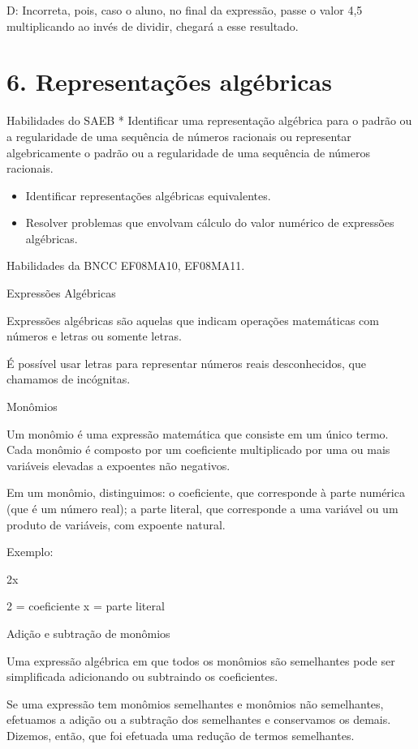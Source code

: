 {D: Incorreta, pois, caso o aluno, no final da expressão, passe o valor
4,5 multiplicando ao invés de dividir, chegará a esse resultado.


\section{6. Representações
algébricas}

Habilidades do SAEB * Identificar uma representação algébrica para o
padrão ou a regularidade de uma sequência de números racionais ou
representar algebricamente o padrão ou a regularidade de uma sequência
de números racionais.

\begin{itemize}
\item
  Identificar representações algébricas equivalentes.
\item
  Resolver problemas que envolvam cálculo do valor numérico de
  expressões algébricas.
\end{itemize}

Habilidades da BNCC EF08MA10, EF08MA11.

Expressões Algébricas

Expressões algébricas são aquelas que indicam operações matemáticas com
números e letras ou somente letras.

É possível usar letras para representar números reais desconhecidos, que
chamamos de incógnitas.

Monômios

Um monômio é uma expressão matemática que consiste em um único termo.
Cada monômio é composto por um coeficiente multiplicado por uma ou mais
variáveis elevadas a expoentes não negativos.

Em um monômio, distinguimos: o coeficiente, que corresponde à parte
numérica (que é um número real); a parte literal, que corresponde a uma
variável ou um produto de variáveis, com expoente natural.

Exemplo:

2x

2 = coeficiente x = parte literal

Adição e subtração de monômios

Uma expressão algébrica em que todos os monômios são semelhantes pode
ser simplificada adicionando ou subtraindo os coeficientes.

Se uma expressão tem monômios semelhantes e monômios não semelhantes,
efetuamos a adição ou a subtração dos semelhantes e conservamos os
demais. Dizemos, então, que foi efetuada uma redução de termos
semelhantes.

}
